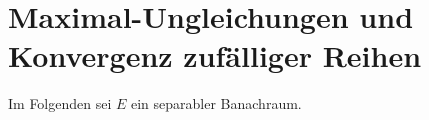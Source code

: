 \chapter{Maximal-Ungleichungen und Konvergenz zufälliger Reihen}
Im Folgenden sei $E$ ein separabler Banachraum. 



%
